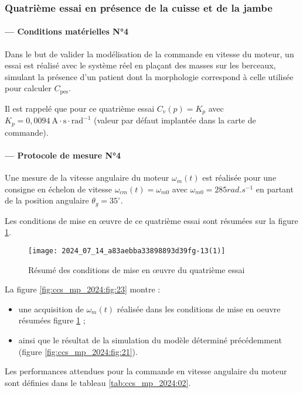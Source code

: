 \subsubsection*{Quatrième essai en présence de la cuisse et de la jambe}
\paragraph*{— Conditions matérielles N°4}
Dans le but de valider la modélisation de la commande en vitesse du moteur, un essai est réalisé avec le système réel en plaçant des masses sur les berceaux, simulant la présence d'un patient dont la morphologie correspond à celle utilisée pour calculer $C_{\mathrm{pes}}$.

Il est rappelé que pour ce quatrième essai $C_{v}(p)=K_{p}$ avec $K_{p}=0,0094 \mathrm{~A} \cdot \mathrm{s} \cdot \mathrm{rad}^{-1}$ (valeur par défaut implantée dans la carte de commande).

\paragraph*{— Protocole de mesure N°4}
Une mesure de la vitesse angulaire du moteur $\omega_{m}(t)$ est réalisée pour une consigne en échelon de vitesse $\omega_{c m}(t)=\omega_{m 0}$ avec $\omega_{m 0}=285 \si{rad.s^{-1}}$ en partant de la position angulaire $\theta_{g}=35^{\circ}$.

Les conditions de mise en œuvre de ce quatrième essai sont résumées sur la figure \ref{fig:ccs_mp_2024:fig:22}.

\begin{figure}[!h]\centering
\texttt{[image: 2024\_07\_14\_a83aebba33898893d39fg-13(1)]}
\caption{\label{fig:ccs_mp_2024:fig:22}Résumé des conditions de mise en œuvre du quatrième essai}
\end{figure}
La figure \ref{fig:ccs_mp_2024:fig:23} montre :

\begin{itemize}
  \item une acquisition de $\omega_{m}(t)$ réalisée dans les conditions de mise en oeuvre résumées figure \ref{fig:ccs_mp_2024:fig:22} ;

  \item ainsi que le résultat de la simulation du modèle déterminé précédemment (figure \ref{fig:ccs_mp_2024:fig:21}).

\end{itemize}

Les performances attendues pour la commande en vitesse angulaire du moteur sont définies dans le tableau \ref{tab:ccs_mp_2024:02}.

